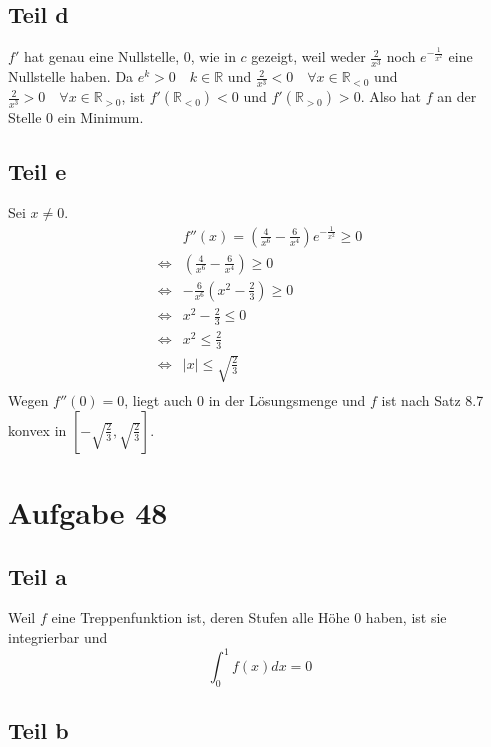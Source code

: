 \documentclass[a4paper,10pt]{article}
\begin{document}
\subsection*{Teil d}

$f'$ hat genau eine Nullstelle, $0$, wie in $c$ gezeigt, weil weder $\frac{2}{x^3}$ noch $e^{-\frac{1}{x^2}}$ eine Nullstelle haben.
Da $e^k > 0 \quad k \in \mathbb{R}$ und $\frac{2}{x^3} < 0 \quad \forall x \in \mathbb{R}_{< 0}$ und $\frac{2}{x^3} > 0 \quad \forall x \in \mathbb{R}_{> 0}$, ist $f'(\mathbb{R}_{< 0}) < 0$ und $f'(\mathbb{R}_{> 0}) > 0$.
Also hat $f$ an der Stelle $0$ ein Minimum.

\subsection*{Teil e}

Sei $x \ne 0$.
\begin{align*}
 & f''(x) = (\frac{4}{x^6} - \frac{6}{x^4}) e^{-\frac{1}{x^2}} \ge 0\\
 \Leftrightarrow & (\frac{4}{x^6} - \frac{6}{x^4}) \ge 0\\
 \Leftrightarrow & -\frac{6}{x^6}(x^2 - \frac{2}{3}) \ge 0\\
 \Leftrightarrow & x^2 - \frac{2}{3} \le 0\\
 \Leftrightarrow & x^2 \le \frac{2}{3}\\
 \Leftrightarrow & |x| \le \sqrt{\frac{2}{3}}\\
\end{align*}
Wegen $f''(0) = 0$, liegt auch $0$ in der Lösungsmenge und $f$ ist nach Satz 8.7 konvex in $[-\sqrt{\frac{2}{3}}, \sqrt{\frac{2}{3}}]$.

\section*{Aufgabe 48}

\subsection*{Teil a}

Weil $f$ eine Treppenfunktion ist, deren Stufen alle Höhe $0$ haben, ist sie integrierbar und
\begin{equation}
 \int_0^1 f(x) dx = 0
\end{equation}

\subsection*{Teil b}
\end{document}
